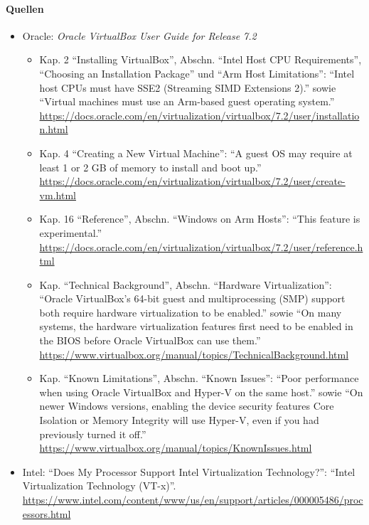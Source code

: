 \paragraph{Quellen}
\begin{itemize}[quellen]
  \item Oracle: \emph{Oracle VirtualBox User Guide for Release 7.2}
  \begin{itemize}[nosep]
    \item Kap. 2 \enquote{Installing VirtualBox}, Abschn. \enquote{Intel Host CPU Requirements}, \enquote{Choosing an Installation Package} und \enquote{Arm Host Limitations}: \enquote{Intel host CPUs must have SSE2 (Streaming SIMD Extensions 2).} sowie \enquote{Virtual machines must use an Arm-based guest operating system.} \url{https://docs.oracle.com/en/virtualization/virtualbox/7.2/user/installation.html}
    \item Kap. 4 \enquote{Creating a New Virtual Machine}: \enquote{A guest OS may require at least 1 or 2 GB of memory to install and boot up.} \url{https://docs.oracle.com/en/virtualization/virtualbox/7.2/user/create-vm.html}
    \item Kap. 16 \enquote{Reference}, Abschn. \enquote{Windows on Arm Hosts}: \enquote{This feature is experimental.} \url{https://docs.oracle.com/en/virtualization/virtualbox/7.2/user/reference.html}
    \item Kap. \enquote{Technical Background}, Abschn. \enquote{Hardware Virtualization}: \enquote{Oracle VirtualBox's 64-bit guest and multiprocessing (SMP) support both require hardware virtualization to be enabled.} sowie \enquote{On many systems, the hardware virtualization features first need to be enabled in the BIOS before Oracle VirtualBox can use them.} \url{https://www.virtualbox.org/manual/topics/TechnicalBackground.html}
    \item Kap. \enquote{Known Limitations}, Abschn. \enquote{Known Issues}: \enquote{Poor performance when using Oracle VirtualBox and Hyper-V on the same host.} sowie \enquote{On newer Windows versions, enabling the device security features Core Isolation or Memory Integrity will use Hyper-V, even if you had previously turned it off.} \url{https://www.virtualbox.org/manual/topics/KnownIssues.html}
  \end{itemize}
  \item Intel: \enquote{Does My Processor Support Intel Virtualization Technology?}: \enquote{Intel Virtualization Technology (VT-x)}. \url{https://www.intel.com/content/www/us/en/support/articles/000005486/processors.html}
\end{itemize}


